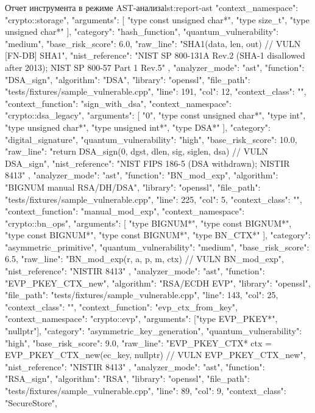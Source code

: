 \documentclass{itmo-vkr}
\begin{document}
\begin{itmolisting}[JSON]{Отчет инструмента в режиме AST-анализа}{lst:report-ast}
{{			"context_namespace": "crypto::storage",
			"arguments": [
			"type const unsigned char*",
			"type size_t",
			"type unsigned char*"
			],
			"category": "hash_function",
			"quantum_vulnerability": "medium",
			"base_risk_score": 6.0,
			"raw_line": "SHA1(data, len, out) // VULN [FN-DB] SHA1",
			"nist_reference": "NIST SP 800-131A Rev.2 (SHA-1 disallowed after 2013); NIST SP 800-57 Part 1 Rev.5"
		},
		{
			"analyzer_mode": "ast",
			"function": "DSA_sign",
			"algorithm": "DSA",
			"library": "openssl",
			"file_path": "tests/fixtures/sample_vulnerable.cpp",
			"line": 191,
			"col": 12,
			"context_class": "",
			"context_function": "sign_with_dsa",
			"context_namespace": "crypto::dsa_legacy",
			"arguments": [
			"0",
			"type const unsigned char*",
			"type int",
			"type unsigned char*",
			"type unsigned int*",
			"type DSA*"
			],
			"category": "digital_signature",
			"quantum_vulnerability": "high",
			"base_risk_score": 10.0,
			"raw_line": "return DSA_sign(0, dgst, dlen, sig, siglen, dsa) // VULN DSA_sign",
			"nist_reference": "NIST FIPS 186-5 (DSA withdrawn); NISTIR 8413"
		},
		{
			"analyzer_mode": "ast",
			"function": "BN_mod_exp",
			"algorithm": "BIGNUM manual RSA/DH/DSA",
			"library": "openssl",
			"file_path": "tests/fixtures/sample_vulnerable.cpp",
			"line": 225,
			"col": 5,
			"context_class": "",
			"context_function": "manual_mod_exp",
			"context_namespace": "crypto::bn_ops",
			"arguments": [
			"type BIGNUM*",
			"type const BIGNUM*",
			"type const BIGNUM*",
			"type const BIGNUM*",
			"type BN_CTX*"
			],
			"category": "asymmetric_primitive",
			"quantum_vulnerability": "medium",
			"base_risk_score": 6.5,
			"raw_line": "BN_mod_exp(r, a, p, m, ctx) // VULN BN_mod_exp",
			"nist_reference": "NISTIR 8413"
		},
		{
			"analyzer_mode": "ast",
			"function": "EVP_PKEY_CTX_new",
			"algorithm": "RSA/ECDH EVP",
			"library": "openssl",
			"file_path": "tests/fixtures/sample_vulnerable.cpp",
			"line": 143,
			"col": 25,
			"context_class": "",
			"context_function": "evp_ctx_from_key",
			"context_namespace": "crypto::evp",
			"arguments": ["type EVP_PKEY*", "nullptr"],
			"category": "asymmetric_key_generation",
			"quantum_vulnerability": "high",
			"base_risk_score": 9.0,
			"raw_line": "EVP_PKEY_CTX* ctx = EVP_PKEY_CTX_new(ec_key, nullptr) // VULN EVP_PKEY_CTX_new",
			"nist_reference": "NISTIR 8413"
		},
		{
			"analyzer_mode": "ast",
			"function": "RSA_sign",
			"algorithm": "RSA",
			"library": "openssl",
			"file_path": "tests/fixtures/sample_vulnerable.cpp",
			"line": 89,
			"col": 9,
			"context_class": "SecureStore",
}}
\end{itmolisting}
\end{document}
